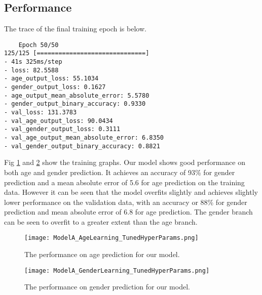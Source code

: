 \subsection{Performance}
The trace of the final training epoch is below.

\begin{verbatim}
    Epoch 50/50
125/125 [==============================] 
- 41s 325ms/step 
- loss: 82.5588 
- age_output_loss: 55.1034 
- gender_output_loss: 0.1627 
- age_output_mean_absolute_error: 5.5780 
- gender_output_binary_accuracy: 0.9330 
- val_loss: 131.3783 
- val_age_output_loss: 90.0434 
- val_gender_output_loss: 0.3111 
- val_age_output_mean_absolute_error: 6.8350 
- val_gender_output_binary_accuracy: 0.8821
\end{verbatim}

Fig \ref{fig:ModelAPerformanceAge} and \ref{fig:ModelAPerformanceGender}
show the training graphs. Our model shows good performance on both age and gender prediction. It achieves an accuracy
of 93\% for gender prediction and a mean absolute error of 5.6 for age prediction on the training data. 
However it can be seen that the model overfits slightly and achieves slightly lower performance on the validation
data, with an accuracy or 88\% for gender prediction and mean absolute error of 6.8 for age prediction. The gender 
branch can be seen to overfit to a greater extent than the age branch.

\begin{figure}
    \centering
    \texttt{[image: ModelA\_AgeLearning\_TunedHyperParams.png]}
    \caption{\label{fig:ModelAPerformanceAge} The performance on age prediction for our model.}
\end{figure}


\begin{figure}
    \centering
    \texttt{[image: ModelA\_GenderLearning\_TunedHyperParams.png]}
    \caption{\label{fig:ModelAPerformanceGender} The performance on gender prediction for our model.}
\end{figure}

